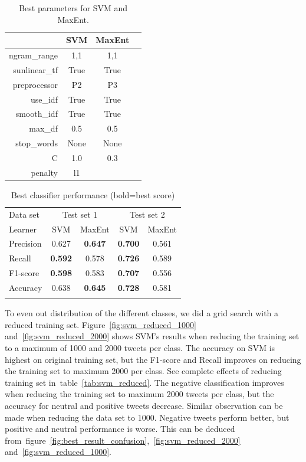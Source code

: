 \begin{table}[!htb]
\centering
\begin{tabular}{|r||c|c|c|} 
\cline{2-3}
\multicolumn{1}{c|}{ } & \textbf{SVM} & \textbf{MaxEnt} \\ \hline
ngram\_range & 1,1 & 1,1 \\ \hline
sunlinear\_tf  & True & True \\ \hline
preprocessor & P2 & P3 \\ \hline
use\_idf & True & True \\ \hline
smooth\_idf & True & True \\ \hline
max\_df & 0.5 & 0.5 \\ \hline
stop\_words & None & None \\ \hline
C & 1.0 & 0.3 \\ \hline
penalty & l1 & \\ \hline

\end{tabular}
\caption{Best parameters for SVM and MaxEnt.}
\label{tab:svm_maxent_best_params}
\end{table}


\begin{table}[!htb]
	\centering
	\begin{tabular}{l|cc|cc} 
	\noalign{\smallskip}\hline\noalign{\smallskip}
	Data set & \multicolumn{2}{c|}{Test set 1} & \multicolumn{2}{c}{Test set 2} \\
	Learner  & SVM    & MaxEnt & SVM    & MaxEnt \\
	\noalign{\smallskip}\hline\noalign{\smallskip}
	Precision  & 0.627  & {\bf 0.647}   & {\bf 0.700}  & 0.561 \\
	Recall       & {\bf 0.592}  & 0.578  & {\bf 0.726}  & 0.589 \\
	F1-score  & {\bf 0.598}  & 0.583  & {\bf 0.707}  & 0.556 \\
	Accuracy & 0.638  & {\bf 0.645}  & {\bf 0.728}  & 0.581 \\
	\noalign{\smallskip}\hline\noalign{\smallskip}
	\end{tabular}
	\caption{Best classifier performance {\small (bold=best score)}}
	\label{tab:performance}
\end{table}


To even out distribution of the different classes, we did a grid search with a reduced training set. Figure~\ref{fig:svm_reduced_1000} and~\ref{fig:svm_reduced_2000} shows SVM's results when reducing the training set to a maximum of 1000 and 2000 tweets per class. The accuracy on SVM is highest on original training set, but the F1-score and Recall improves on reducing the training set to maximum 2000 per class. See complete effects of reducing training set in~table~\ref{tab:svm_reduced}. The negative classification improves when reducing the training set to maximum 2000 tweets per class, but the accuracy for neutral and positive tweets decrease. Similar observation can be made when reducing the data set to 1000. Negative tweets perform better, but positive and neutral performance is worse. This can be deduced from~figure~\ref{fig:best_result_confusion},~\ref{fig:svm_reduced_2000} and~\ref{fig:svm_reduced_1000}.


